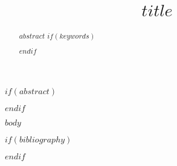 \documentclass[utf8]{FrontiersinHarvard}
\title{$title$}
\author[\firstAuthorLast]{\Authors}
\begin{document}
\maketitle

$if(abstract)$
\begin{abstract}
$abstract$
$if(keywords)$

$endif$
\end{abstract}
$endif$

$body$

$if(bibliography)$

$endif$
\end{document}
